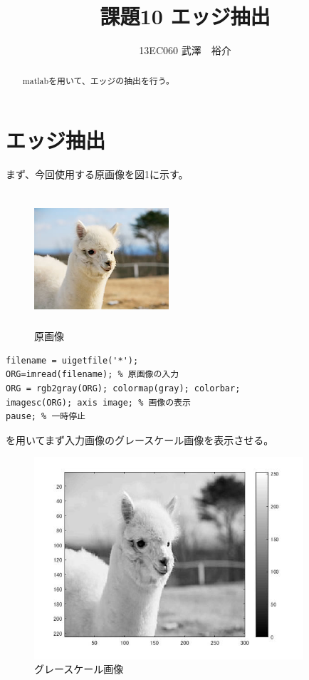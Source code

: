 \documentclass{jsarticle}
\begin{document}
\title{課題10 エッジ抽出}
\author{13EC060 武澤　裕介}
\maketitle
\begin{abstract}
matlabを用いて、エッジの抽出を行う。
\end{abstract}
\section{エッジ抽出}
まず、今回使用する原画像を図1に示す。


\begin{figure}[htbp]
 \begin{center}
  \includegraphics[width=5cm,height=5cm]{a.jpg}
 \end{center}
 \caption{原画像}
\end{figure}

\begin{lstlisting}[basicstyle=\ttfamily\footnotesize, frame=single]
filename = uigetfile('*');
ORG=imread(filename); % 原画像の入力
ORG = rgb2gray(ORG); colormap(gray); colorbar;
imagesc(ORG); axis image; % 画像の表示
pause; % 一時停止
 \end{lstlisting}
を用いてまず入力画像のグレースケール画像を表示させる。

\newpage
\begin{figure}[htbp]
 \begin{center}
  \includegraphics[width=10cm]{8-0.jpg}
 \end{center}
 \caption{グレースケール画像}
\end{figure}
\end{document}
